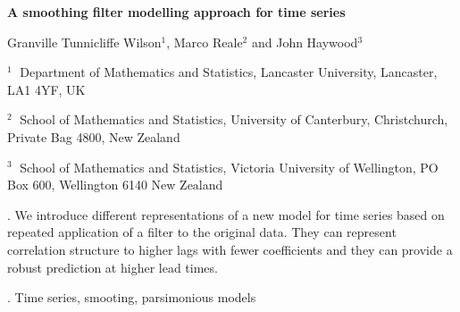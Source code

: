 \documentclass[12pt]{article}
\begin{document}
\begin{flushleft}


{\LARGE\bf A smoothing filter modelling approach for time series}


\vspace{1.0cm}

Granville Tunnicliffe Wilson$^1$, Marco Reale$^2$ and John Haywood$^3$

\begin{description}

\item $^1 \;$ Department of Mathematics and Statistics, Lancaster University,
Lancaster, LA1 4YF, UK

\item $^2 \;$ School of Mathematics and Statistics, University of Canterbury, Christchurch, Private Bag 4800, New Zealand

\item $^3 \;$ School of Mathematics and Statistics, Victoria University of Wellington, PO Box 600, Wellington 6140 New Zealand

\end{description}

\end{flushleft}


\vspace{0.75cm}

. We introduce different representations of a new model for time series based on repeated application of a filter to the original data.
They can represent correlation structure to higher lags with fewer coefficients and they can provide a robust prediction at higher lead times.

\vskip 2mm

.
Time series, smooting, parsimonious models
\end{document}
